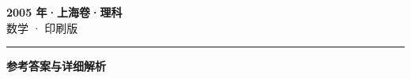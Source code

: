 \documentclass[zihao=5, a4paper]{ctexart}
\begin{document}
\begin{center}
  {\Large\bfseries 2005 年·上海卷·理科}\\[4pt]
  {\large 数学 · 印刷版}
\end{center}
\medskip
{}

\par\bigskip\hrule\bigskip
{}
\begin{center}{\large\bfseries 参考答案与详细解析}\end{center}
\smallskip

\end{document}
